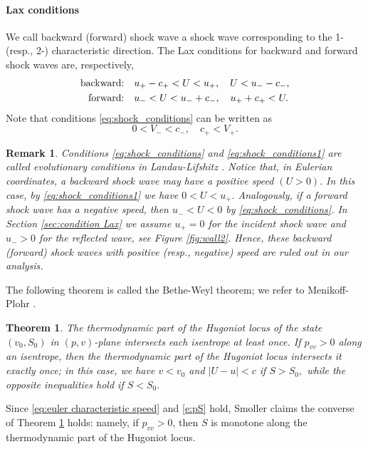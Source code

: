 \documentclass[10pt,a4paper]{article}
\newtheorem{theorem}{Theorem}[section]
\newtheorem{nb}{Remark}[section]
\numberwithin{equation}{section}
\begin{document}
\paragraph{Lax conditions}
We call backward (forward) shock wave a shock wave corresponding to the 1- (resp., 2-) characteristic direction. The Lax conditions for backward and forward shock waves are, respectively,
\begin{align}
\label{eq:shock_conditions1}
\hbox{backward:\quad } &u_+ - c_+ < U  < u_+, \quad U < u_- - c_-,
\\
\label{eq:shock_conditions}
\hbox{forward:\quad } &u_- < U < u_- + c_-, \quad u_+ + c_+ < U.
\end{align}
Note that conditions \eqref{eq:shock_conditions} can be written as
\begin{equation}\label{eq:shock_conditions_2}
0 < V_-  <  c_-, \quad  c_+ < V_+.
\end{equation} 

\begin{nb}\label{nb:positive backward}
Conditions \eqref{eq:shock_conditions} and \eqref{eq:shock_conditions1} are called {\em evolutionary conditions} in Landau-Lifshitz \cite[\S 88]{Landau-Lifshitz}. Notice that, in Eulerian coordinates, a backward shock wave may have a positive speed $(U > 0).$ In this case, by \eqref{eq:shock_conditions1} we have $0 < U < u_+.$  Analogously, if a forward shock wave has a negative speed, then $u_- < U < 0$ by \eqref{eq:shock_conditions}. In Section \ref{sec:condition Lax} we assume $u_+ = 0$ for the incident shock wave and $u_- > 0$ for the reflected wave, see Figure \ref{fig:wall2}. Hence, these backward (forward) shock waves with positive (resp., negative) speed are ruled out in our analysis. 
\end{nb}

The following theorem is called the Bethe-Weyl theorem; we refer to  Menikoff-Plohr \cite[Th. 4.1]{Menikoff-Plohr}.
% 
\begin{theorem}\label{thm:Bethe-Weyl}
The thermodynamic part of the Hugoniot locus of the state $(v_0,S_0)$ in $(p,v)$-plane intersects each isentrope at least once. If $p_{vv} > 0$ along an isentrope, then the thermodynamic part of the Hugoniot locus intersects it exactly once; in this case, we have $v < v_0$ and $|U - u| < c$ if $S > S_0,$ while the opposite inequalities hold if $S < S_0.$  
\end{theorem}
\par
Since \eqref{eq:euler characteristic speed} and \eqref{e:pS} hold,  Smoller \cite[Th. 18.3]{Smoller} claims the converse of Theorem \ref{thm:Bethe-Weyl} holds: namely, if $p_{vv} > 0$, then $S$ is monotone along the thermodynamic part of the Hugoniot locus.
\end{document}
